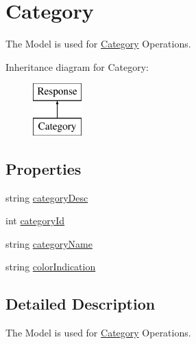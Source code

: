 \hypertarget{classWildlifeTrackingApp_1_1Models_1_1Category}{}\section{Category}
\label{classWildlifeTrackingApp_1_1Models_1_1Category}


The Model is used for \hyperlink{classWildlifeTrackingApp_1_1Models_1_1Category}{Category} Operations.  


Inheritance diagram for Category\+:\begin{figure}[H]
\begin{center}
\leavevmode
\includegraphics[height=2.000000cm]{classWildlifeTrackingApp_1_1Models_1_1Category}
\end{center}
\end{figure}
\subsection*{Properties}
\begin{DoxyCompactItemize}
\item 
string \hyperlink{classWildlifeTrackingApp_1_1Models_1_1Category_ae992743f1fc0d9386b609d8871a4bd6b}{category\+Desc}
\item 
int \hyperlink{classWildlifeTrackingApp_1_1Models_1_1Category_a423f91c56dc35040d661cfbe357f7c78}{category\+Id}
\item 
string \hyperlink{classWildlifeTrackingApp_1_1Models_1_1Category_a1eca787c85e1bc45b49bbd281d4106fd}{category\+Name}
\item 
string \hyperlink{classWildlifeTrackingApp_1_1Models_1_1Category_a0ecdefcc99a4b41b1ef3a04167756366}{color\+Indication}
\end{DoxyCompactItemize}


\subsection{Detailed Description}
The Model is used for \hyperlink{classWildlifeTrackingApp_1_1Models_1_1Category}{Category} Operations. 



